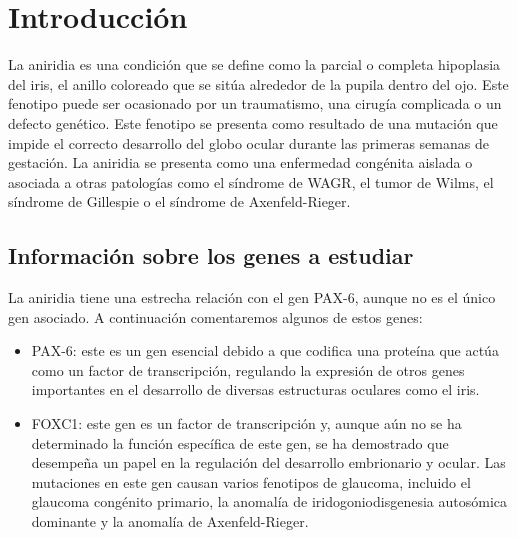 \section{Introducción}


La aniridia es una condición que se define como la parcial o completa hipoplasia del iris, el anillo coloreado que se sitúa alrededor de la pupila dentro del ojo. Este fenotipo puede ser ocasionado por un traumatismo, una cirugía complicada o un defecto genético. 
Este fenotipo se presenta como resultado de una mutación que impide el correcto desarrollo del globo ocular durante las primeras semanas de gestación. La aniridia se presenta como una enfermedad congénita aislada o asociada a otras patologías como el síndrome de WAGR, el tumor de Wilms, el síndrome de Gillespie o el síndrome de Axenfeld-Rieger.

\subsection{Información sobre los genes a estudiar}

La aniridia tiene una estrecha relación con el gen PAX-6, aunque no es el único gen asociado. A continuación comentaremos algunos de estos genes: 

\begin{itemize}
	\item PAX-6: este es un gen esencial debido a que codifica una proteína que actúa como un factor de transcripción, regulando la expresión de otros genes importantes en el desarrollo de diversas estructuras oculares como el iris.
	\item FOXC1: este gen es un factor de transcripción y, aunque aún no se ha determinado la función específica de este gen, se ha demostrado que desempeña un papel en la regulación del desarrollo embrionario y ocular. Las mutaciones en este gen causan varios fenotipos de glaucoma, incluido el glaucoma congénito primario, la anomalía de iridogoniodisgenesia autosómica dominante y la anomalía de Axenfeld-Rieger.
	
	
\end{itemize}


